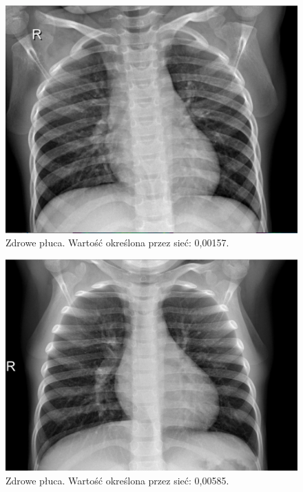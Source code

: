 \documentclass[12pt,a4paper,twoside,titlepage,openright]{book}
\begin{document}
\begin{figure}[ht]
	\centering
			\includegraphics[resolution=100, scale=0.3]{randomCertain1.png}
		\caption{Zdrowe płuca. Wartość określona przez sieć: 0,00157.}
				\label{fig:randomCertain1}
\end{figure}

\begin{figure}[ht]
	\centering
			\includegraphics[resolution=100, scale=0.3]{randomCertain2.png}
		\caption{Zdrowe płuca. Wartość określona przez sieć: 0,00585.}
				\label{fig:randomCertain2}
\end{figure}
\end{document}
